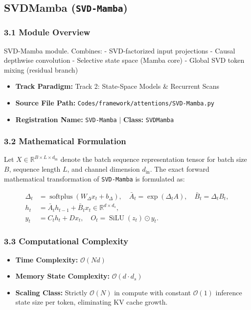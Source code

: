 \subsection{SVDMamba (\texttt{SVD-Mamba})}
\label{sec:app_module_SVD-Mamba}

\subsubsection*{3.1 Module Overview}
SVD-Mamba module.  Combines: - SVD-factorized input projections - Causal depthwise convolution - Selective state space (Mamba core) - Global SVD token mixing (residual branch)
\begin{itemize}
    \item \textbf{Track Paradigm:} Track 2: State-Space Models & Recurrent Scans
    \item \textbf{Source File Path:} \texttt{Codes/framework/attentions/SVD-Mamba.py}
    \item \textbf{Registration Name:} \texttt{SVD-Mamba} $\mid$ \textbf{Class:} \texttt{SVDMamba}
\end{itemize}

\subsubsection*{3.2 Mathematical Formulation}
Let $X \in \mathbb{R}^{B \times L \times d_{\text{in}}}$ denote the batch sequence representation tensor for batch size $B$, sequence length $L$, and channel dimension $d_{\text{in}}$. The exact forward mathematical transformation of \texttt{SVD-Mamba} is formulated as:

\begin{align}
\Delta_t &= \operatorname{softplus}(W_\Delta x_t + b_\Delta), \quad \bar{A}_t = \exp(\Delta_t A), \quad \bar{B}_t = \Delta_t B_t, \\
h_t &= \bar{A}_t h_{t-1} + \bar{B}_t x_t \in \mathbb{R}^{d \times d_s}, \\
y_t &= C_t h_t + D x_t, \quad O_t = \operatorname{SiLU}(z_t) \odot y_t.
\end{align}


\subsubsection*{3.3 Computational Complexity}
\begin{itemize}
    \item \textbf{Time Complexity:} $\mathcal{O}(N d)$
    \item \textbf{Memory State Complexity:} $\mathcal{O}(d \cdot d_s)$
    \item \textbf{Scaling Class:} Strictly $\mathcal{O}(N)$ in compute with constant $\mathcal{O}(1)$ inference state size per token, eliminating KV cache growth.
\end{itemize}

